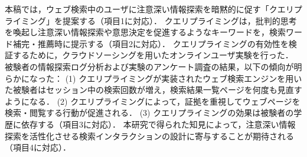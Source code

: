 本稿では，ウェブ検索中のユーザに注意深い情報探索を暗黙的に促す「クエリプライミング」を提案する（項目1に対応）．
クエリプライミングは，批判的思考を喚起し注意深い情報探索や意思決定を促進するようなキーワードを，検索ワード補完・推薦時に提示する（項目2に対応）．
クエリプライミングの有効性を検証するために，クラウドソーシングを用いたオンラインユーザ実験を行った．
被験者の情報探索ログ分析および実験のアンケート調査の結果，以下の傾向が明らかになった：
(1) クエリプライミングが実装されたウェブ検索エンジンを用いた被験者はセッション中の検索回数が増え，検索結果一覧ページを何度も見直すようになる．
(2) クエリプライミングによって，証拠を重視してウェブページを検索・閲覧する行動が促進される．
(3) クエリプライミングの効果は被験者の学歴に依存する（項目3に対応）．
本研究で得られた知見によって，注意深い情報探索を活性化させる検索インタラクションの設計に寄与することが期待される（項目4に対応）．
